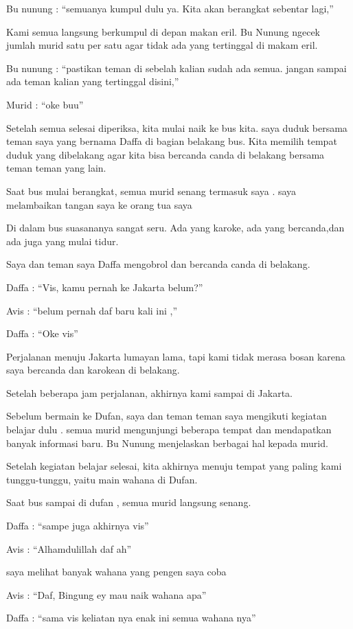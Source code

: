 Bu nunung : “semuanya kumpul dulu ya. Kita akan berangkat sebentar lagi,”


Kami semua langsung berkumpul di depan makan eril. Bu Nunung ngecek jumlah murid satu per satu agar tidak ada yang tertinggal di makam eril.


Bu nunung : “pastikan teman di sebelah kalian sudah ada semua. jangan sampai ada teman kalian yang tertinggal disini,”


Murid : “oke buu”


Setelah semua selesai diperiksa, kita mulai naik ke bus kita. saya duduk bersama teman saya yang bernama Daffa di bagian belakang bus. Kita memilih tempat duduk yang dibelakang agar kita bisa bercanda canda di belakang bersama teman teman yang lain.


Saat bus mulai berangkat, semua murid senang termasuk saya . saya melambaikan tangan saya ke orang tua saya


Di dalam bus suasananya sangat seru. Ada yang karoke, ada yang bercanda,dan ada juga yang mulai tidur.


Saya dan teman saya Daffa mengobrol dan bercanda canda di belakang.


Daffa : “Vis, kamu pernah ke Jakarta belum?”


Avis : “belum pernah daf baru kali ini ,”


Daffa : “Oke vis”


Perjalanan menuju Jakarta lumayan lama, tapi kami tidak merasa bosan karena saya bercanda dan karokean di belakang.


Setelah beberapa jam perjalanan, akhirnya kami sampai di Jakarta.


Sebelum bermain ke Dufan, saya dan teman teman saya mengikuti kegiatan belajar dulu . semua murid mengunjungi beberapa tempat dan mendapatkan banyak informasi baru. Bu Nunung menjelaskan berbagai hal kepada murid.


Setelah kegiatan belajar selesai, kita akhirnya menuju tempat yang paling kami tunggu-tunggu, yaitu main wahana di Dufan.


Saat bus sampai di dufan , semua murid langsung senang.


Daffa : “sampe juga akhirnya vis”


Avis : “Alhamdulillah daf ah”


saya melihat banyak wahana yang pengen saya coba


Avis : “Daf, Bingung ey mau naik wahana apa”


Daffa : “sama vis keliatan nya enak ini semua wahana nya”


